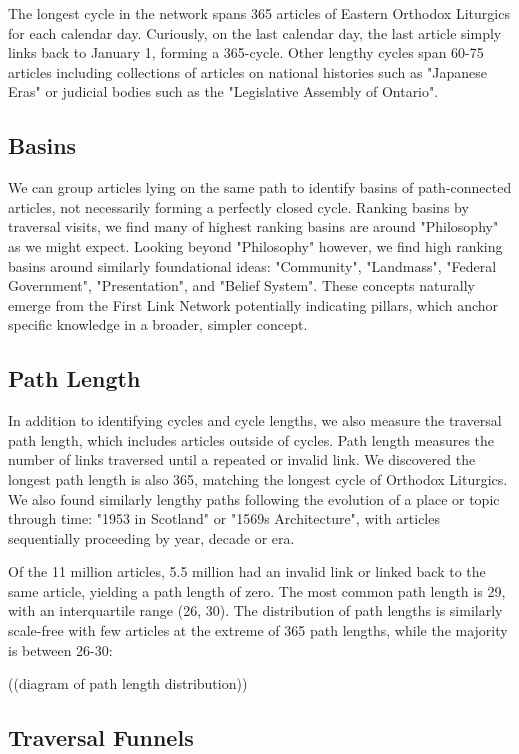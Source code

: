 \documentclass[twoside]{article}
\begin{document}
The longest cycle in the network spans 365 articles of Eastern Orthodox Liturgics for each calendar day. 
Curiously, on the last calendar day, the last article simply links back to January 1, forming a 365-cycle.
Other lengthy cycles span 60-75 articles including collections of articles on national histories such as "Japanese Eras" 
or judicial bodies such as the "Legislative Assembly of Ontario".


\subsection{Basins}
We can group articles lying on the same path to identify basins of path-connected articles, not necessarily forming a perfectly closed cycle.
Ranking basins by traversal visits, we find many of highest ranking basins are around "Philosophy" as we might expect. 
Looking beyond "Philosophy" however, we find high ranking basins around similarly foundational ideas:
"Community", "Landmass", "Federal Government", "Presentation", and "Belief System". 
These concepts naturally emerge from the First Link Network potentially indicating pillars, which 
anchor specific knowledge in a broader, simpler concept.


\subsection{Path Length}

In addition to identifying cycles and cycle lengths, we also measure the traversal path length, which includes articles outside
of cycles. 
Path length measures the number of links traversed until a repeated or invalid link. 
We discovered the longest path length is also 365, matching the longest cycle of Orthodox Liturgics. 
We also found similarly lengthy paths following the evolution of a place or topic through time: 
"1953 in Scotland" or "1569s Architecture", with articles sequentially proceeding by year, decade or era.

Of the 11 million articles, 5.5 million had an invalid link or linked back to the same article, yielding a path length of zero. 
The most common path length is 29, with an interquartile range (26, 30).
The distribution of path lengths is similarly scale-free with few articles at the extreme of 365 path lengths, while the majority 
is between 26-30: 

((diagram of path length distribution))



\subsection{Traversal Funnels}
\end{document}
